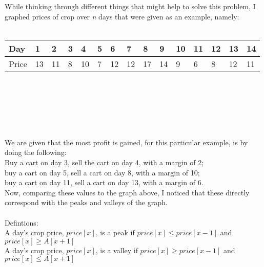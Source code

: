\documentclass[11pt]{article}
\begin{document}
		While thinking through different things that might help to solve this problem, I graphed prices of crop over \textit{n} days that were given as an example, namely: \\
		\\
		\begin{tabu} to 1 \textwidth { | X[c] | X[c] | X[c] | X[c] | X[c] | X[c] | X[c] | X[c] | X[c] | X[c] | X[c] | X[c] | X[c] | X[c] | X[c] |}
			\hline
			Day & 1 & 2 & 3 & 4 & 5 & 6 & 7 & 8 & 9 & 10 & 11 & 12 & 13 & 14 \\
			\hline
			Price  & 13  & 11 & 8 & 10 & 7 & 12 & 12 & 17 & 14 & 9 & 6 & 8 & 12 & 11  \\
			\hline
		\end{tabu}\\
	\\
	\\
		 \\
		\\
		We are given that the most profit is gained, for this particular example, is by doing the following:\\
		Buy a cart on day 3, sell the cart on day 4, with a margin of 2;\\
		buy a cart on day 5, sell a cart on day 8, with a margin of 10;\\
		buy a cart on day 11, sell a cart on day 13, with a margin of 6.\\
		Now, comparing these values to the graph above, I noticed that these directly correspond with the peaks and valleys of the graph. \\
		\\
		Defintions:\\
		A day's crop price, $price[x]$, is a peak if $price[x] \leq price[x-1]$ and $price[x] \geq A[x+1]$\\
		A day's crop price, $price[x]$, is a valley if $price[x] \geq price[x-1]$ and $price[x] \leq A[x+1]$\\
\end{document}
